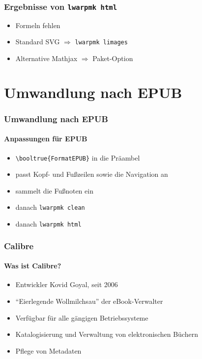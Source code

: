 \documentclass[12pt,ngerman]{beamer}
\begin{document}
\begin{frame}
\frametitle{Ergebnisse von \texttt{lwarpmk html}}

\begin{center}
\end{center}

\begin{itemize}
	\item Formeln fehlen
	\item Standard SVG $\Rightarrow$ \texttt{lwarpmk limages}
	\item Alternative Mathjax $\Rightarrow$ Paket-Option
\end{itemize}

\end{frame}

\section{Umwandlung nach EPUB}

\begin{frame}[fragile]
\frametitle{Umwandlung nach EPUB}
\framesubtitle{Anpassungen für EPUB}

\begin{itemize}
\item \verb|\booltrue{FormatEPUB}| in die Präambel
\item passt Kopf- und Fußzeilen sowie die Navigation an
\item sammelt die Fußnoten ein
\item danach \texttt{lwarpmk clean}
\item danach \texttt{lwarpmk html}
\end{itemize}
\end{frame}


\begin{frame}
\frametitle{Calibre}
\framesubtitle{Was ist Calibre?}

\begin{itemize}
\item Entwickler Kovid Goyal, seit 2006
\item \enquote{Eierlegende Wollmilchsau} der eBook-Verwalter
\item Verfügbar für alle gängigen Betriebssysteme
\item Katalogisierung und Verwaltung von elektronischen Büchern
\item Pflege von Metadaten
\end{itemize}
\end{frame}
\end{document}
